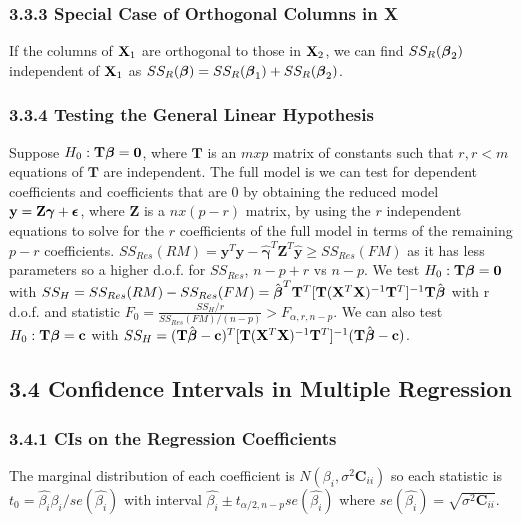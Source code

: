 \begin{multicols*}{3}
\subsubsection{3.3.3 Special Case of Orthogonal Columns in X}
If the columns of $\mathbf{X}_1$ are orthogonal to those in $\mathbf{X}_2$, we can find $SS_R(\boldsymbol{\beta}_2)$ independent of $\mathbf{X}_1$ as $SS_R(\boldsymbol{\beta}) = SS_R(\boldsymbol{\beta}_1) + SS_R(\boldsymbol{\beta}_2)$.

\subsubsection{3.3.4 Testing the General Linear Hypothesis}
Suppose $H_0: \mathbf{T}\boldsymbol{\beta} = \mathbf{0}$, where $\mathbf{T}$ is an $mxp$ matrix of constants such that $r, r < m$ equations of $\mathbf{T}$ are independent. The full model is  we can test for dependent coefficients and coefficients that are $0$ by obtaining the reduced model $\mathbf{y} = \mathbf{Z}\boldsymbol{\gamma} + \boldsymbol{\epsilon}$, where $\mathbf{Z}$ is a $n x (p-r)$ matrix, by using the $r$ independent equations to solve for the $r$ coefficients of the full model in terms of the remaining $p - r$ coefficients. $SS_{Res}(RM) = \mathbf{y}^T\mathbf{y} - \hat{\boldsymbol{\gamma}}^T\mathbf{Z}^T\hat{\mathbf{y}} \geq SS_{Res}(FM)$ as it has less parameters so a higher d.o.f. for $SS_{Res}$, $n-p+r$ vs $n-p$. We test $H_0: \mathbf{T}\boldsymbol{\beta}=\mathbf{0}$ with $SS_H = SS_{Res}(RM) - SS_{Res}(FM) = \hat{\boldsymbol{\beta}}^T\mathbf{T}^T[\mathbf{T}(\mathbf{X}^T\mathbf{X})^{-1}\mathbf{T}^T]^{-1}\mathbf{T}\hat{\boldsymbol{\beta}}$ with r d.o.f. and statistic $F_0 = \frac{SS_H/r}{SS_{Res}(FM)/(n-p)} > F_{\alpha,r,n-p}$. We can also test $H_0: \mathbf{T}\boldsymbol{\beta}=\mathbf{c}$ with $SS_H = (\mathbf{T}\hat{\boldsymbol{\beta}}-\mathbf{c})^T[\mathbf{T}(\mathbf{X}^T\mathbf{X})^{-1}\mathbf{T}^T]^{-1}(\mathbf{T}\hat{\boldsymbol{\beta}}-\mathbf{c})$.

\subsection{3.4 Confidence Intervals in Multiple Regression}
\subsubsection{3.4.1 CIs on the Regression Coefficients}
The marginal distribution of each coefficient is $N(\beta_i, \sigma^2\mathbf{C}_{ii})$ so each statistic is $t_0 = \hat{\beta_i}\beta_i/se(\hat{\beta_i})$ with interval $\hat{\beta_i} \pm t_{\alpha/2,n-p}se(\hat{\beta_i})$ where $se(\hat{\beta_i}) = \sqrt{\sigma^2\mathbf{C}_{ii}}$.


\end{multicols*}
